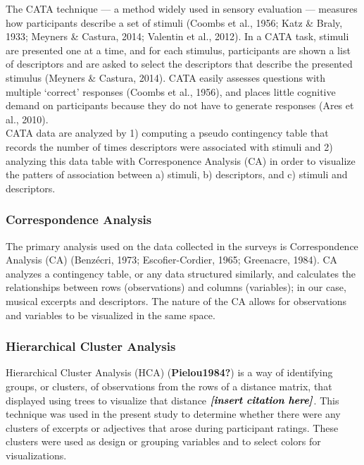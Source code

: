 \documentclass[
  english,
  man,floatsintext]{apa6}
\begin{document}
The CATA technique --- a method widely used in sensory evaluation --- measures how participants describe a set of stimuli (Coombs et al., 1956; Katz \& Braly, 1933; Meyners \& Castura, 2014; Valentin et al., 2012). In a CATA task, stimuli are presented one at a time, and for each stimulus, participants are shown a list of descriptors and are asked to select the descriptors that describe the presented stimulus (Meyners \& Castura, 2014). CATA easily assesses questions with multiple `correct' responses (Coombs et al., 1956), and places little cognitive demand on participants because they do not have to generate responses (Ares et al., 2010).\\
CATA data are analyzed by 1) computing a pseudo contingency table that records the number of times descriptors were associated with stimuli and 2) analyzing this data table with Corresponence Analysis (CA) in order to visualize the patters of association between a) stimuli, b) descriptors, and c) stimuli and descriptors.

\hypertarget{correspondence-analysis}{%
\subsubsection{Correspondence Analysis}\label{correspondence-analysis}}

The primary analysis used on the data collected in the surveys is Correspondence Analysis (CA) (Benzécri, 1973; Escofier-Cordier, 1965; Greenacre, 1984). CA analyzes a contingency table, or any data structured similarly, and calculates the relationships between rows (observations) and columns (variables); in our case, musical excerpts and descriptors. The nature of the CA allows for observations and variables to be visualized in the same space.

\hypertarget{hierarchical-cluster-analysis}{%
\subsubsection{Hierarchical Cluster Analysis}\label{hierarchical-cluster-analysis}}

Hierarchical Cluster Analysis (HCA) (\textbf{Pielou1984?}) is a way of identifying groups, or clusters, of observations from the rows of a distance matrix, that displayed using trees to visualize that distance \(\textbf{\textit{[insert citation here]}}\). This technique was used in the present study to determine whether there were any clusters of excerpts or adjectives that arose during participant ratings. These clusters were used as design or grouping variables and to select colors for visualizations.
\end{document}
